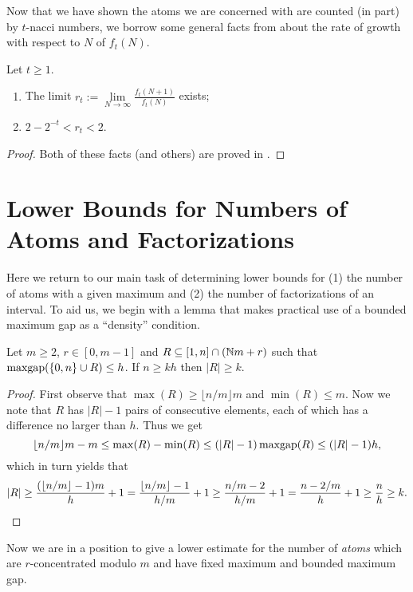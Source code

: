 Now that we have shown the atoms we are concerned with are counted (in part) by $t$-nacci numbers, we borrow some general facts from \cite{wolfram98} about the rate of growth with respect to $N$ of $f_t(N)$.

\begin{prop} \label{prop:nacci growth}
Let $t\ge 1$.
\begin{enumerate}[label = {(\roman{*})}]
	\item The limit $r_t := \lim\limits_{N\to\infty} \frac{f_t(N+1)}{f_t(N)}$ exists;
	\item $2-2^{-t} < r_t < 2$.
\end{enumerate}
\end{prop}

\begin{proof}
Both of these facts (and others) are proved in \cite[Lemma 3.6 and Corollary 3.7]{wolfram98}.
\end{proof}

\section{Lower Bounds for Numbers of Atoms and Factorizations}

Here we return to our main task of determining lower bounds for (1) the number of atoms with a given maximum and (2) the number of factorizations of an interval. 
To aid us, we begin with a lemma that makes practical use of a bounded maximum gap as a ``density'' condition.

\begin{lemma} \label{lem:bounded gap but many elements}
	Let $m\ge 2$, $r\in[0,m-1]$ and $R\subseteq [1,n]\cap(\mathbb{N} m + r)$ such that $\operatorname{maxgap}(\{0,n\}\cup R) \le h$.
	If $n \ge kh$ then $|R| \ge k$.
\end{lemma}

\begin{proof}
First observe that $\max(R) \ge \lfloor n/m \rfloor m$ and $\min(R) \le m$.
Now we note that $R$ has $|R|-1$ pairs of consecutive elements, each of which has a difference no larger than $h$.
Thus we get
\[ \lfloor n/m \rfloor m - m \le \max(R) - \min(R) \le (|R|-1)\operatorname{maxgap}(R) \le (|R|-1)h, \]
which in turn yields that 
\[|R| \ge \frac{(\lfloor n/m \rfloor -1)m}{h}+1 = \frac{\lfloor n/m \rfloor -1}{h/m}+1 \ge \frac{n/m-2}{h/m}+1 = \frac{n-2/m}{h}+1 \ge \frac{n}{h} \ge k.\qedhere\]
\end{proof}


Now we are in a position to give a lower estimate for the number of \textit{atoms} which are $r$-concentrated modulo $m$ and have fixed maximum and bounded maximum gap.  

